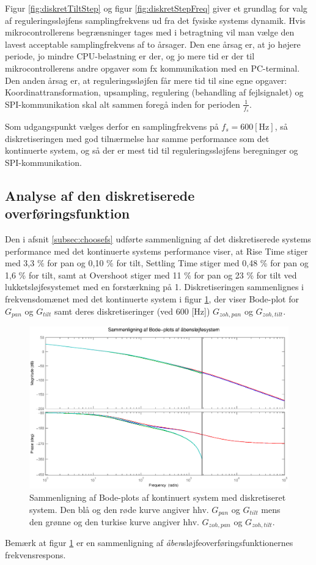 Figur \ref{fig:diskretTiltStep} og figur \ref{fig:diskretStepFreq}
giver et grundlag for valg af reguleringssløjfens samplingfrekvens ud fra det fysiske systems dynamik.
Hvis mikrocontrollerens begrænsninger tages med i betragtning vil man vælge den lavest acceptable
samplingfrekvens af to årsager. Den ene årsag er, at jo højere periode, jo mindre CPU-belastning er der,
og jo mere tid er der til mikrocontrollerens andre opgaver som fx kommunikation med en PC-terminal.
Den anden årsag er, at reguleringssløjfen får mere tid til sine egne opgaver:
Koordinattransformation, upsampling, regulering (behandling af fejlsignalet) og SPI-kommunikation skal alt sammen foregå
inden for perioden \(\frac{1}{f_s}\).

Som udgangspunkt vælges derfor en samplingfrekvens på \(f_s=600 \mathrm{\left[Hz\right]}\),
så diskretiseringen med god tilnærmelse har samme performance som det kontinuerte system,
og så der er mest tid til reguleringssløjfens beregninger og SPI-kommunikation.

\subsection{Analyse af den diskretiserede overføringsfunktion}
Den i afsnit \ref{subsec:choosefs} udførte sammenligning af det diskretiserede systems performance
med det kontinuerte systems performance viser,
at Rise Time stiger med 3,3 \% for pan og 0,10 \% for tilt,
Settling Time stiger med 0,48 \% for pan og 1,6 \% for tilt,
samt at Overshoot stiger med 11 \% for pan og 23 \% for tilt
ved lukketsløjfesystemet med en forstærkning på 1.
Diskretiseringen sammenlignes i frekvensdomænet med det kontinuerte system
i figur \ref{fig:diskretBode}, der viser Bode-plot for \(G_{pan}\) og \(G_{tilt}\) samt
deres diskretiseringer (ved 600 [Hz]) \(G_{zoh,pan}\) og \(G_{zoh,tilt}\).
\begin{figure}[!th]
\centering
	\includegraphics[width=1\textwidth]{./graphics/diskretBode.eps}
\caption[Sammenligning af Bode-plots af kontinuert system med diskretiseret system]
{Sammenligning af Bode-plots af kontinuert system med diskretiseret system.
Den blå og den røde kurve angiver hhv. \(G_{pan}\) og \(G_{tilt}\) mens
den grønne og den turkise kurve angiver hhv. \(G_{zoh,pan}\) og \(G_{zoh,tilt}\).
}
\label{fig:diskretBode}
\end{figure}
Bemærk at figur \ref{fig:diskretBode} er en sammenligning af \textit{åben}sløjfeoverføringsfunktionernes
frekvensrespons.

